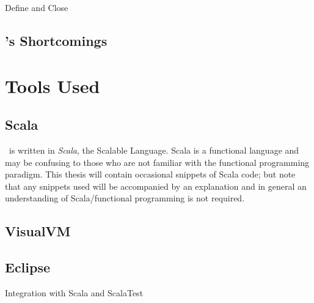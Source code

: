 Define and Close

\subsection{\Beagle's Shortcomings}
\label{sec:shortcomings}



\section{Tools Used}

\subsection{Scala}
\label{sec:scala}

\Beagle\ is written in \emph{Scala}, the Scalable Language. Scala
is a functional language and may be confusing to those who are not familiar with the
functional programming paradigm. This thesis will contain occasional snippets of
Scala code; but note that any snippets used will be accompanied by an explanation
and in general an understanding of Scala/functional programming is not required.

\cite{scala}

\subsection{VisualVM}
\cite{visualvm}

\subsection{Eclipse}
Integration with Scala and ScalaTest

\cite{eclipse}
\cite{scalaide}
\cite{scalatest}

